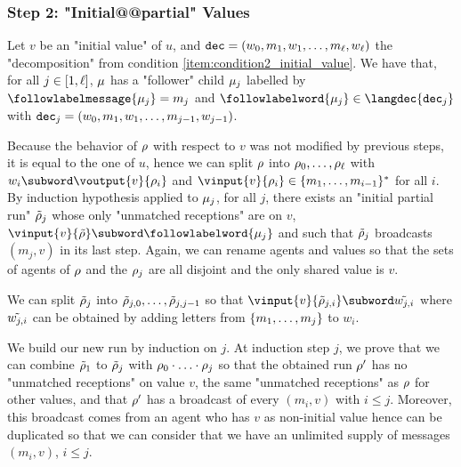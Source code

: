 \subsubsection{Step 2: "Initial@@partial" Values}
\label{sec:tree-to-run-step-two}


Let $v$ be an "initial value" of $u$, and $\mathtt{dec} = \\(w_0, m_1, w_1, \ldots, m_\ell, w_\ell)$ the "decomposition" from condition \ref{item:condition2_initial_value}. We have that, for all $j \in [1,\ell]$, $\mu$ has a "follower" child $\mu_j$ labelled by $\followlabelmessage{\node_j} = m_j$ and $\followlabelword{\node_j} \in \langdec{\decsymb_j}$ with $\mathtt{dec}_j = (w_0, m_1, w_1, \ldots, m_{j-1}, w_{j-1})$. 

Because the behavior of $\rho$ with respect to $v$ was not modified by previous steps, it is equal to the one of $u$, hence we can split $\rho$ into $\rho_0, \ldots, \rho_\ell$ with $w_i \subword \voutput{\aval}{\run_i}$ and $\vinput{\aval}{\run_i} \in \set{m_1, \dots, m_{i-1}}^*$ for all $i$. 
By induction hypothesis applied to $\mu_j$, for all $j$, there exists an "initial partial run" $\Tilde{\rho}_j$ whose only "unmatched receptions" are on $v$, $\vinput{v}{\Tilde{\run}} \subword \followlabelword{\node_{j}}$ and such that $\tilde{\rho}_j$ broadcasts $(m_j,v)$ in its last step. Again, we can rename agents and values so that the sets of agents of $\rho$ and the $\rho_j$ are all disjoint and the only shared value is $v$. 

We can split $\Tilde{\rho}_j$ into $\Tilde{\rho}_{j, 0}, \ldots, \Tilde{\rho}_{j,j-1}$ so that  $\vinput{v}{\Tilde{\run}_{j, i}} \subword \Tilde{w_{j,i}}$ where $\Tilde{w_{j,i}}$ can be obtained by adding letters from $\{m_1, \ldots, m_j\}$ to $w_i$.

We build our new run by induction on $j$. At induction step $j$, we prove that we can combine $\Tilde{\rho}_1$ to $\Tilde{\rho}_j$ with $\rho_0 \cdot \ldots \cdot \rho_j$ so that the obtained run $\rho'$ has no "unmatched receptions" on value $v$, the same "unmatched receptions" as $\rho$ for other values, and that $\rho'$ has a broadcast of every $(m_i,v)$ with $i \leq j$. Moreover, this broadcast comes from an agent who has $v$ as non-initial value hence can be duplicated so that we can consider that we have an unlimited supply of messages $(m_i,v)$, $i \leq j$. 

